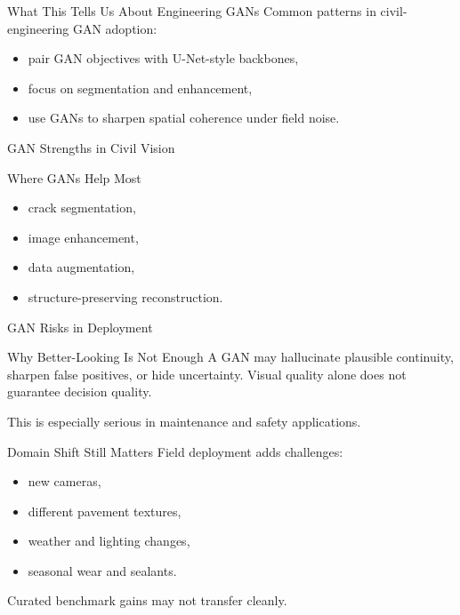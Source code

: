 \documentclass[12pt]{beamer}
\begin{document}
\begin{frame}{What This Tells Us About Engineering GANs}
  Common patterns in civil-engineering GAN adoption:
  \begin{itemize}
    \item pair GAN objectives with U-Net-style backbones,
    \item focus on segmentation and enhancement,
    \item use GANs to sharpen spatial coherence under field noise.
  \end{itemize}
\end{frame}

\begin{frame}{GAN Strengths in Civil Vision}
  \begin{examplebox}{Where GANs Help Most}
    \begin{itemize}
      \item crack segmentation,
      \item image enhancement,
      \item data augmentation,
      \item structure-preserving reconstruction.
    \end{itemize}
  \end{examplebox}
\end{frame}

\begin{frame}{GAN Risks in Deployment}
  \begin{warningbox}{Why Better-Looking Is Not Enough}
    A GAN may hallucinate plausible continuity, sharpen false positives, or hide uncertainty. Visual quality alone does not guarantee decision quality.
  \end{warningbox}

  This is especially serious in maintenance and safety applications.
\end{frame}

\begin{frame}{Domain Shift Still Matters}
  Field deployment adds challenges:
  \begin{itemize}
    \item new cameras,
    \item different pavement textures,
    \item weather and lighting changes,
    \item seasonal wear and sealants.
  \end{itemize}

  Curated benchmark gains may not transfer cleanly.
\end{frame}
\end{document}
